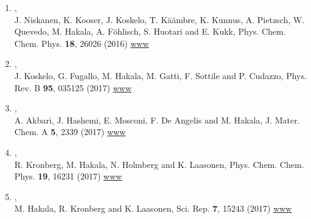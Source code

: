 \documentclass[12pt,a4]{report}
\begin{document}
\begin{enumerate}
\item{},\\
J. Niskanen, K. Kooser, J. Koskelo, T. K{\"a}{\"a}mbre, K. Kunnus, A. Pietzsch, W. Quevedo, M. Hakala, A. F{\"o}hlisch, S. Huotari and E. Kukk, Phys. Chem. Chem. Phys. {\bf 18}, 26026 (2016)
\href{http://pubs.rsc.org/en/Content/ArticleLanding/2016/CP/C6CP03220F#!divAbstract}{www}



\item{},\\
J. Koskelo, G. Fugallo, M. Hakala, M. Gatti, F. Sottile and P. Cudazzo, Phys. Rev. B {\bf 95}, 035125 (2017)
\href{http://journals.aps.org/prb/abstract/10.1103/PhysRevB.95.035125}{www}

\item{},\\
A. Akbari, J. Hashemi, E. Mosconi, F. De Angelis and M. Hakala, J. Mater. Chem. A {\bf 5}, 2339 (2017)
\href{http://pubs.rsc.org/en/content/articlelanding/2016/ta/c6ta08874k#!divAbstract}{www}

\item{},\\
R. Kronberg, M. Hakala, N. Holmberg and K. Laasonen, Phys. Chem. Chem. Phys. {\bf 19}, 16231 (2017)
\href{http://pubs.rsc.org/en/Content/ArticleLanding/2017/CP/C7CP03068A}{www}

\item{},\\
M. Hakala, R. Kronberg and K. Laasonen, Sci. Rep. {\bf 7}, 15243 (2017)
\href{https://www.nature.com/articles/s41598-017-15622-z}{www}






\end{enumerate}
\end{document}
